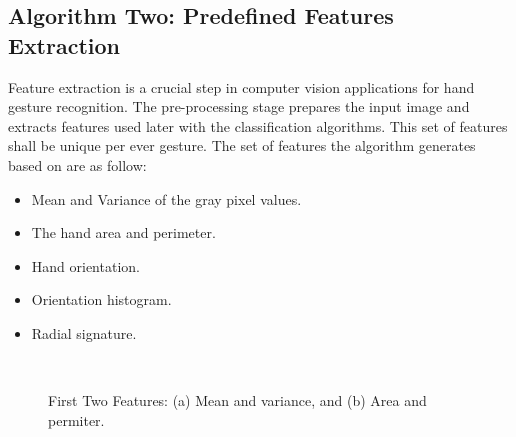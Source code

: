 \subsection{Algorithm Two: Predefined Features Extraction}
Feature extraction is a crucial step in computer vision applications for hand gesture recognition. The pre-processing stage prepares the input image and extracts features used later with the classification algorithms. This set of features shall be unique per ever gesture. The set of features the algorithm generates based on \cite{paper2sT} are as follow:
\bigskip
\begin{itemize}
\item Mean and Variance of the gray pixel values.
\item The hand area and perimeter.
\item Hand orientation.
\item Orientation histogram.
\item Radial signature.
\end{itemize}
\bigskip
\begin{figure}[h]
\begin{dBox}
\centering
  \mbox{
   }
   \caption{First Two Features: (a) Mean and variance, and (b) Area and permiter. \cite{paper2sT} \label{fig:mean_area} }   
\end{dBox}   
\end{figure}
